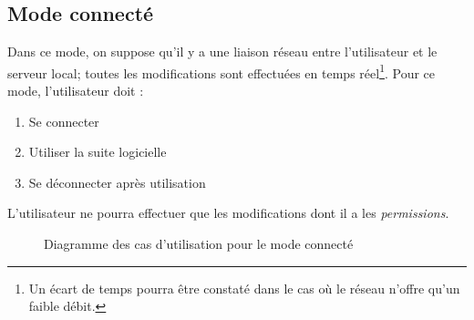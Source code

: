 \subsection{Mode connecté}
Dans ce mode, on suppose qu'il y a une liaison réseau entre l'utilisateur et le serveur local; toutes les modifications sont effectuées en \og{}temps réel\footnote{Un écart de temps pourra être constaté dans le cas où le réseau n'offre qu'un faible débit.}\fg{}. Pour ce mode, l'utilisateur doit :
\begin{enumerate}
    \item Se connecter
    \item Utiliser la suite logicielle
    \item Se déconnecter après utilisation
\end{enumerate}
L'utilisateur ne pourra effectuer que les modifications dont il a les \emph{permissions}.
\begin{figure}[htbp]
    \centering
	\caption{Diagramme des cas d'utilisation pour le mode connecté}
	\label{ucmodeco}
\end{figure}

